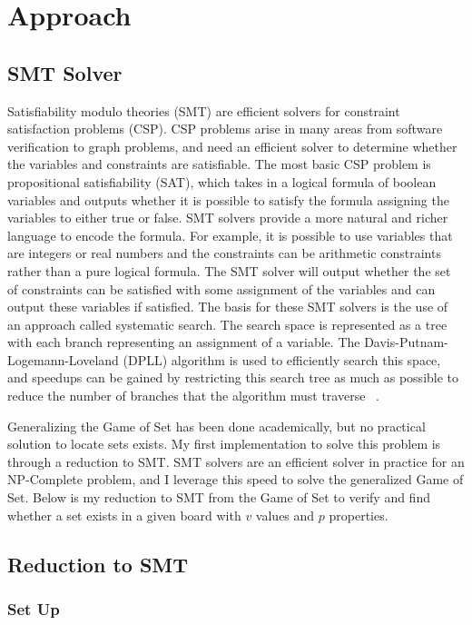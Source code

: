 \documentclass[pageno]{jpaper}
\begin{document}
\section{Approach}

\subsection{SMT Solver}
Satisfiability modulo theories (SMT) are efficient solvers for constraint satisfaction problems (CSP). CSP problems arise in many areas from software verification to graph problems, and need an efficient solver to determine whether the variables and constraints are satisfiable. The most basic CSP problem is propositional satisfiability (SAT), which takes in a logical formula of boolean variables and outputs whether it is possible to satisfy the formula assigning the variables to either true or false. SMT solvers provide a more natural and richer language to encode the formula. For example, it is possible to use variables that are integers or real numbers and the constraints can be arithmetic constraints rather than a pure logical formula. The SMT solver will output whether the set of constraints can be satisfied with some assignment of the variables and can output these variables if satisfied. The basis for these SMT solvers is the use of an approach called systematic search. The search space is represented as a tree with each branch representing an assignment of a variable. The Davis-Putnam-Logemann-Loveland (DPLL) algorithm is used to efficiently search this space, and speedups can be gained by restricting this search tree as much as possible to reduce the number of branches that the algorithm must traverse ~\cite{SMTbackground}.

Generalizing the Game of Set has been done academically, but no practical solution to locate sets exists. My first implementation to solve this problem is through a reduction to SMT. SMT solvers are an efficient solver in practice for an NP-Complete problem, and I leverage this speed to solve the generalized Game of Set. Below is my reduction to SMT from the Game of Set to verify and find whether a set exists in a given board with $v$ values and $p$ properties.


\subsection{Reduction to SMT}

\subsubsection{Set Up}
\end{document}
